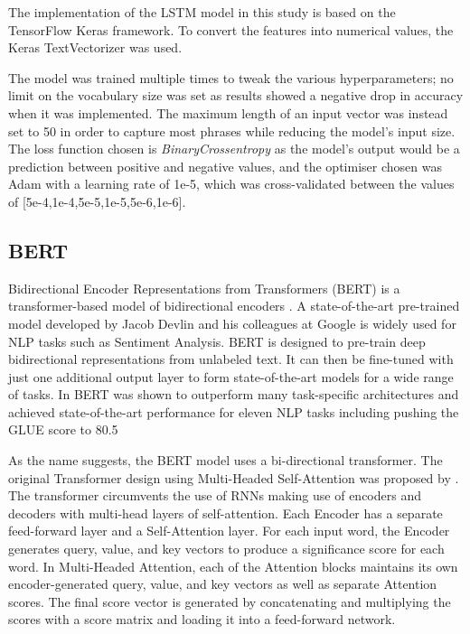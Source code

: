 \documentclass{svproc}
\begin{document}
The implementation of the LSTM model in this study is based on the TensorFlow Keras framework. To convert the features into numerical values, the Keras TextVectorizer was used.

The model was trained multiple times to tweak the various hyperparameters;  no limit on the vocabulary size was set as results showed a negative drop in accuracy when it was implemented. The maximum length of an input vector was instead set to 50 in order to capture most phrases while reducing the model's input size. The loss function chosen is \textit{BinaryCrossentropy} as the model's output would be a prediction between positive and negative values, and the optimiser chosen was Adam with a learning rate of 1e-5, which was cross-validated between the values of  [5e-4,1e-4,5e-5,1e-5,5e-6,1e-6].

\subsection{BERT}
Bidirectional Encoder Representations from Transformers (BERT) is a transformer-based model of bidirectional encoders \citep{devlin2018bert}. A state-of-the-art pre-trained model developed by Jacob Devlin and his colleagues at Google is widely used for NLP tasks such as Sentiment Analysis. BERT is designed to pre-train deep bidirectional representations from unlabeled text. It can then be fine-tuned with just one additional output layer to form state-of-the-art models for a wide range of tasks. In \citep{devlin2018bert} BERT was shown to outperform many task-specific architectures and achieved state-of-the-art performance for eleven NLP tasks including pushing the GLUE score to 80.5%

As the name suggests, the BERT model uses a bi-directional transformer. The original Transformer design using Multi-Headed Self-Attention was proposed by \cite{vaswani2017attention}. The transformer circumvents the use of RNNs making use of encoders and decoders with multi-head layers of self-attention. Each Encoder has a separate feed-forward layer and a Self-Attention layer. For each input word, the Encoder generates query, value, and key vectors to produce a significance score for each word. In Multi-Headed Attention, each of the Attention blocks maintains its own encoder-generated query, value, and key vectors as well as separate Attention scores. The final score vector is generated by concatenating and multiplying the scores with a score matrix and loading it into a feed-forward network.
\end{document}
